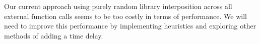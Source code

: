 \documentclass[letterpaper,twocolumn,10pt]{article}
\begin{document}
Our current approach using purely random library interposition across all external function calls seems to be too costly in terms of performance.  We will need to improve this performance by implementing heuristics and exploring other methods of adding a time delay.

%
%
\end{document}
